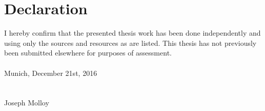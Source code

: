 \documentclass[a4paper, 11pt, oneside]{Thesis}  %
\begin{document}
{\chapter*{Declaration}
I hereby confirm that the presented thesis work has been done independently and using only the sources and resources as are listed. This thesis has not previously been submitted elsewhere for purposes of assessment. \\ \\
Munich, December 21st, 2016 \\ \\

\underline{\hspace{6cm}} \\
Joseph Molloy


\tableofcontents  %

\listoffigures  %

\listoftables  %

}
\end{document}
